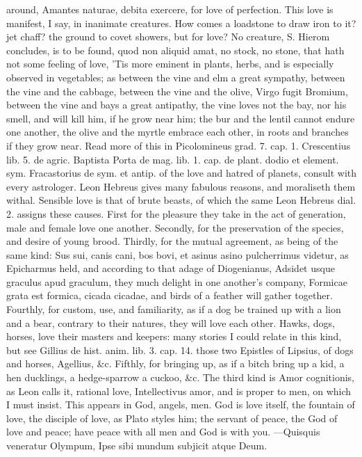 {around, Amantes naturae, debita exercere, for love of perfection.
This love is manifest, I say, in inanimate creatures. How comes a
loadstone to draw iron to it? jet chaff? the ground to covet showers,
but for love? No creature, S. Hierom concludes, is to be found, quod
non aliquid amat, no stock, no stone, that hath not some feeling of
love, 'Tis more eminent in plants, herbs, and is especially observed in
vegetables; as between the vine and elm a great sympathy, between the
vine and the cabbage, between the vine and the olive,  Virgo
fugit Bromium, between the vine and bays a great antipathy, the vine
loves not the bay, nor his smell, and will kill him, if he grow
near him; the bur and the lentil cannot endure one another, the olive
and the myrtle embrace each other, in roots and branches if they
grow near. Read more of this in Picolomineus grad. 7. cap. 1.
Crescentius lib. 5. de agric. Baptista Porta de mag. lib. 1. cap. de
plant. dodio et element. sym. Fracastorius de sym. et antip. of the
love and hatred of planets, consult with every astrologer. Leon Hebreus
gives many fabulous reasons, and moraliseth them withal.
Sensible love is that of brute beasts, of which the same Leon Hebreus
dial. 2. assigns these causes. First for the pleasure they take in the
act of generation, male and female love one another. Secondly, for the
preservation of the species, and desire of young brood. Thirdly, for
the mutual agreement, as being of the same kind: Sus sui, canis cani,
bos bovi, et asinus asino pulcherrimus videtur, as Epicharmus held, and
according to that adage of Diogenianus, Adsidet usque graculus apud
graculum, they much delight in one another's company, Formicae
grata est formica, cicada cicadae, and birds of a feather will gather
together. Fourthly, for custom, use, and familiarity, as if a dog be
trained up with a lion and a bear, contrary to their natures, they will
love each other. Hawks, dogs, horses, love their masters and keepers:
many stories I could relate in this kind, but see Gillius de hist.
anim. lib. 3. cap. 14. those two Epistles of Lipsius, of dogs and
horses, Agellius, \&c. Fifthly, for bringing up, as if a bitch bring up
a kid, a hen ducklings, a hedge-sparrow a cuckoo, \&c.
The third kind is Amor cognitionis, as Leon calls it, rational love,
Intellectivus amor, and is proper to men, on which I must insist. This
appears in God, angels, men. God is love itself, the fountain of love,
the disciple of love, as Plato styles him; the servant of peace, the
God of love and peace; have peace with all men and God is with you.
---Quisquis veneratur Olympum,
Ipse sibi mundum subjicit atque Deum.

}
